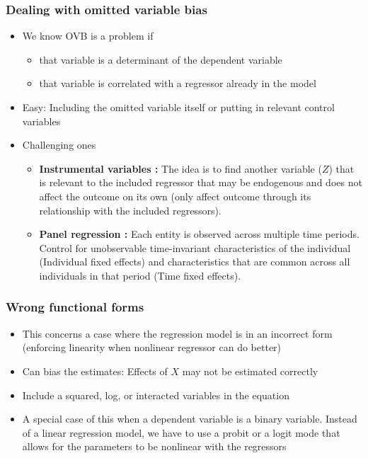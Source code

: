 \documentclass[aspectratio=169]{beamer}
\begin{document}
\begin{frame}
\frametitle{Dealing with omitted variable bias}
\begin{itemize}
\item We know OVB is a problem if 
\begin{itemize}
\item that variable is a determinant of the dependent variable
\item that  variable is correlated with a regressor already in the model
\end{itemize}
\item Easy: Including the omitted variable itself or putting in relevant control variables
\item Challenging ones
\begin{itemize}
\item \textbf{Instrumental variables :} The idea is to find another variable ($Z$) that is relevant to the included regressor that may be endogenous and does not affect the outcome on its own (only affect outcome through its relationship with the included regressors). \medskip
\item \textbf{Panel regression :} Each entity is observed across multiple time periods. Control for unobservable time-invariant characteristics of the individual (Individual fixed effects) and characteristics that are common across all individuals in that period (Time fixed effects). 
\end{itemize}
\end{itemize}
\end{frame}


\begin{frame}
\frametitle{Wrong functional forms}
\begin{itemize}
\item This concerns a case where the regression model is in an incorrect form (enforcing linearity when nonlinear regressor can do better)
\item Can bias the estimates: Effects of $X$ may not be estimated correctly
\item Include a squared, log, or interacted variables in the equation
\item A special case of this when a dependent variable is a binary variable. Instead of a linear regression model, we have to use a probit or a logit mode that allows for the parameters to be nonlinear with the regressors
\end{itemize}
\end{frame}
\end{document}
